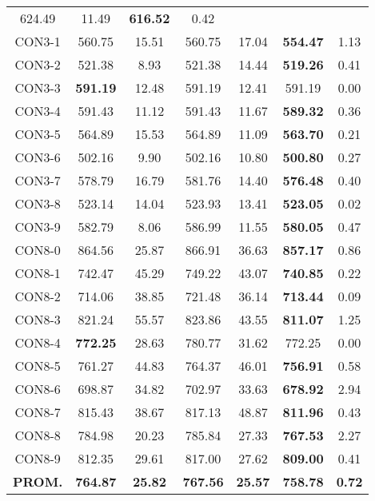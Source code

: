 \begin{table}[ht]
\begin{tabular}{c c c c c c c}
624.49 & 11.49 & \bf{616.52} & 
0.42\\CON3-1 & 560.75 & 15.51 & 
560.75 & 17.04 & \bf{554.47} & 
1.13\\CON3-2 & 521.38 & 8.93 & 
521.38 & 14.44 & \bf{519.26} & 
0.41\\CON3-3 & \bf{591.19} & 12.48 & 
591.19 & 12.41 & 591.19 & 0.00\\
CON3-4 & 591.43 & 11.12 & 
591.43 & 11.67 & \bf{589.32} & 
0.36\\CON3-5 & 564.89 & 15.53 & 
564.89 & 11.09 & \bf{563.70} & 
0.21\\CON3-6 & 502.16 & 9.90 & 
502.16 & 10.80 & \bf{500.80} & 
0.27\\CON3-7 & 578.79 & 16.79 & 
581.76 & 14.40 & \bf{576.48} & 
0.40\\CON3-8 & 523.14 & 14.04 & 
523.93 & 13.41 & \bf{523.05} & 
0.02\\CON3-9 & 582.79 & 8.06 & 
586.99 & 11.55 & \bf{580.05} & 
0.47\\CON8-0 & 864.56 & 25.87 & 
866.91 & 36.63 & \bf{857.17} & 
0.86\\CON8-1 & 742.47 & 45.29 & 
749.22 & 43.07 & \bf{740.85} & 
0.22\\CON8-2 & 714.06 & 38.85 & 
721.48 & 36.14 & \bf{713.44} & 
0.09\\CON8-3 & 821.24 & 55.57 & 
823.86 & 43.55 & \bf{811.07} & 
1.25\\CON8-4 & \bf{772.25} & 28.63 & 
780.77 & 31.62 & 772.25 & 0.00\\
CON8-5 & 761.27 & 44.83 & 
764.37 & 46.01 & \bf{756.91} & 
0.58\\CON8-6 & 698.87 & 34.82 & 
702.97 & 33.63 & \bf{678.92} & 
2.94\\CON8-7 & 815.43 & 38.67 & 
817.13 & 48.87 & \bf{811.96} & 
0.43\\CON8-8 & 784.98 & 20.23 & 
785.84 & 27.33 & \bf{767.53} & 
2.27\\CON8-9 & 812.35 & 29.61 & 
817.00 & 27.62 & \bf{809.00} & 
0.41\\\bf{PROM.} & 
\bf{764.87} & \bf{25.82} & \bf{767.56} & \bf{25.57} & \bf{758.78} & \bf{0.72}\\[1ex]\hline
\end{tabular}
\label{table:nonlin}
\end{table} \clearpage
